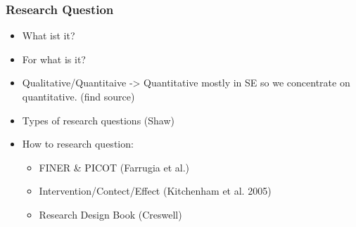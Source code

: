 \subsubsection{Research Question}

\begin{itemize}
	\item What ist it?
	\item For what is it?
	\item Qualitative/Quantitaive -> Quantitative mostly in SE so we concentrate on quantitative. {\color{red} (find source)}
	\item Types of research questions {\color{red} (Shaw)}
	\item How to research question:
		\begin{itemize}
			\item FINER \& PICOT  {\color{red} (Farrugia et al.)}
			\item Intervention/Contect/Effect  {\color{red} (Kitchenham et al. 2005)}
			\item Research Design Book  {\color{red} (Creswell)}
		\end{itemize}
\end{itemize}




